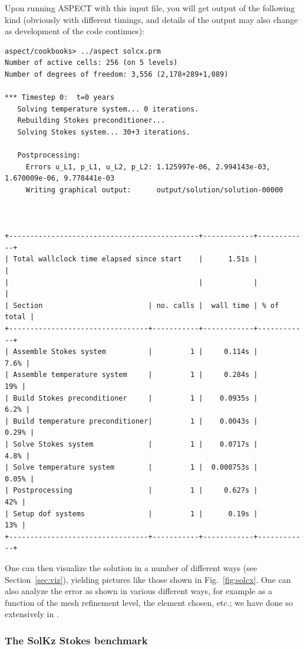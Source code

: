 \documentclass{article}
\newcommand{\aspect}{\textsc{ASPECT}}
\begin{document}
Upon running \aspect{} with this input file, you will get output of the
following kind (obviously with different timings, and details of the output
may also change as development of the code continues):
\begin{lstlisting}[frame=single,language=ksh]
aspect/cookbooks> ../aspect solcx.prm
Number of active cells: 256 (on 5 levels)
Number of degrees of freedom: 3,556 (2,178+289+1,089)

*** Timestep 0:  t=0 years
   Solving temperature system... 0 iterations.
   Rebuilding Stokes preconditioner...
   Solving Stokes system... 30+3 iterations.

   Postprocessing:
     Errors u_L1, p_L1, u_L2, p_L2: 1.125997e-06, 2.994143e-03, 1.670009e-06, 9.778441e-03
     Writing graphical output:      output/solution/solution-00000



+---------------------------------------------+------------+------------+
| Total wallclock time elapsed since start    |      1.51s |            |
|                                             |            |            |
| Section                         | no. calls |  wall time | % of total |
+---------------------------------+-----------+------------+------------+
| Assemble Stokes system          |         1 |     0.114s |       7.6% |
| Assemble temperature system     |         1 |     0.284s |        19% |
| Build Stokes preconditioner     |         1 |    0.0935s |       6.2% |
| Build temperature preconditioner|         1 |    0.0043s |      0.29% |
| Solve Stokes system             |         1 |    0.0717s |       4.8% |
| Solve temperature system        |         1 |  0.000753s |      0.05% |
| Postprocessing                  |         1 |     0.627s |        42% |
| Setup dof systems               |         1 |      0.19s |        13% |
+---------------------------------+-----------+------------+------------+
\end{lstlisting}

One can then visualize the solution in a number of different ways (see
Section~\ref{sec:viz}), yielding pictures like those shown in
Fig.~\ref{fig:solcx}. One can also analyze the error as shown in various
different ways, for example as a function of the mesh refinement level, the
element chosen, etc.; we have done so extensively in \cite{KHB12}.


\subsubsection{The SolKz Stokes benchmark}
\label{sec:benchmark-solkz}
\end{document}
